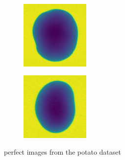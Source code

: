 \documentclass[11pt]{article}
\begin{document}
\begin{figure}[!h]
\begin{subfigure}[b]{0.22\textwidth}
         \caption{}
         \label{fig:perfect_47}
     \end{subfigure}
     \\
    \begin{subfigure}[b]{0.22\textwidth}
         \centering
         \includegraphics[width=\textwidth]{figurer/potato_dataset/perfect/perfect_48.jpg}
         \caption{}
         \label{fig:perfect_48}
     \end{subfigure}
     \hfill
     \begin{subfigure}[b]{0.22\textwidth}
         \centering
         \includegraphics[width=\textwidth]{figurer/potato_dataset/perfect/perfect_49.jpg}
         \caption{}
         \label{fig:perfect_49}
     \end{subfigure}
    \caption{perfect images from the potato dataset}
\end{figure}
\end{document}
